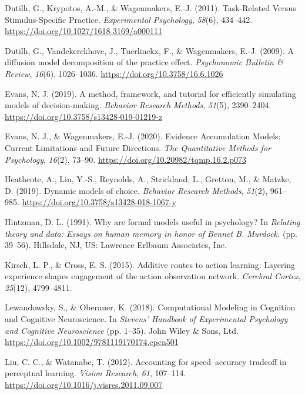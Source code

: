\documentclass[
  man, donotrepeattitle,floatsintext]{apa6}
\newlength{\cslhangindent}
\newenvironment{CSLReferences}[2] %
 {\begin{list}{}{%
  \setlength{\itemindent}{0pt}
  \setlength{\leftmargin}{0pt}
  \setlength{\parsep}{0pt}
  \ifodd #1
   \setlength{\leftmargin}{\cslhangindent}
   \setlength{\itemindent}{-1\cslhangindent}
  \fi
  \setlength{\itemsep}{#2\baselineskip}}}
 {\end{list}}
\begin{document}
\begin{CSLReferences}{1}{0}
Dutilh, G., Krypotos, A.-M., \& Wagenmakers, E.-J. (2011). Task-{Related Versus Stimulus-Specific Practice}. \emph{Experimental Psychology}, \emph{58}(6), 434--442. \url{https://doi.org/10.1027/1618-3169/a000111}

Dutilh, G., Vandekerckhove, J., Tuerlinckx, F., \& Wagenmakers, E.-J. (2009). A diffusion model decomposition of the practice effect. \emph{Psychonomic Bulletin \& Review}, \emph{16}(6), 1026--1036. \url{https://doi.org/10.3758/16.6.1026}

Evans, N. J. (2019). A method, framework, and tutorial for efficiently simulating models of decision-making. \emph{Behavior Research Methods}, \emph{51}(5), 2390--2404. \url{https://doi.org/10.3758/s13428-019-01219-z}

Evans, N. J., \& Wagenmakers, E.-J. (2020). Evidence {Accumulation Models}: {Current Limitations} and {Future Directions}. \emph{The Quantitative Methods for Psychology}, \emph{16}(2), 73--90. \url{https://doi.org/10.20982/tqmp.16.2.p073}

Heathcote, A., Lin, Y.-S., Reynolds, A., Strickland, L., Gretton, M., \& Matzke, D. (2019). Dynamic models of choice. \emph{Behavior Research Methods}, \emph{51}(2), 961--985. \url{https://doi.org/10.3758/s13428-018-1067-y}

Hintzman, D. L. (1991). Why are formal models useful in psychology? In \emph{Relating theory and data: {Essays} on human memory in honor of {Bennet B}. {Murdock}.} (pp. 39--56). Hillsdale, NJ, US: Lawrence Erlbaum Associates, Inc.

Kirsch, L. P., \& Cross, E. S. (2015). Additive routes to action learning: Layering experience shapes engagement of the action observation network. \emph{Cerebral Cortex}, \emph{25}(12), 4799--4811.

Lewandowsky, S., \& Oberauer, K. (2018). Computational {Modeling} in {Cognition} and {Cognitive Neuroscience}. In \emph{Stevens' {Handbook} of {Experimental Psychology} and {Cognitive Neuroscience}} (pp. 1--35). John Wiley \& Sons, Ltd. \url{https://doi.org/10.1002/9781119170174.epcn501}

Liu, C. C., \& Watanabe, T. (2012). Accounting for speed--accuracy tradeoff in perceptual learning. \emph{Vision Research}, \emph{61}, 107--114. \url{https://doi.org/10.1016/j.visres.2011.09.007}


\end{CSLReferences}
\end{document}
